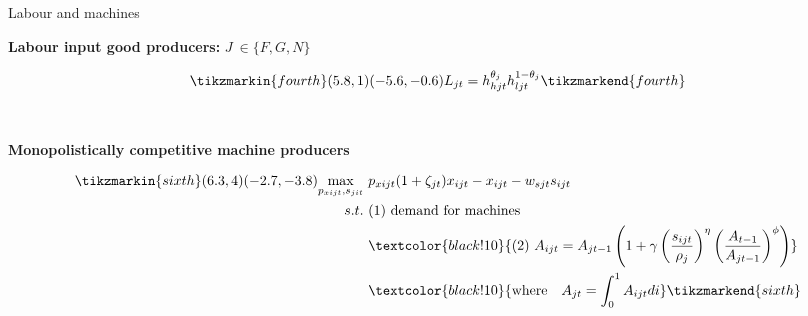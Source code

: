 \documentclass[11pt,aspectratio=169]{beamer}
\begin{document}
\begin{frame}{ Labour and machines}
	
	\textbf{Labour input good producers:} $J\ \in\{F,G,N\}$\\ \vspace{0mm}
	\begin{minipage}[t!]{1\textwidth}
		\begin{align*}
		\tikzmarkin{fourth}(5.8,1)(-5.6,-0.6)
		 L_{jt}=h_{hjt}^{\theta_{j}}h_{ljt}^{1-\theta_{j}}
		\tikzmarkend{fourth}
		\end{align*}
	\end{minipage}
\\
\pause

\vspace{7mm}
	\textbf{Monopolistically competitive machine producers }\\ \vspace{-1mm}
\begin{minipage}[t!]{1\textwidth}
	\begin{align*}
	\tikzmarkin{sixth}(6.3,4)(-2.7,-3.8)
\underset{p_{xijt}, s_{jit}}{\max}\ & p_{xijt}(1+\zeta_{jt})x_{ijt}-x_{ijt}-w_{sjt}s_{ijt}\\
s.t.\ &(1)\ \text{demand for machines }\\ %
& \textcolor{black!10}{(2)\ A_{ijt}=A_{jt-1}\left(1+\gamma\left(\frac{s_{ijt}}{\rho_j}\right)^\eta\left(\frac{A_{t-1}}{A_{jt-1}}\right)^\phi\right)}\\
& \textcolor{black!10}{\text{where}\ \ \ A_{jt}=\int_{0}^{1}A_{ijt} di}
	\tikzmarkend{sixth}
	\end{align*}
\end{minipage}
\end{frame}

\addtocounter{framenumber}{-1}
\end{document}
